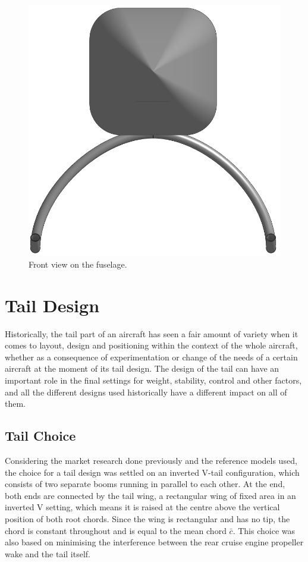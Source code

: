 \documentclass[english,fira]{ist-report}
\begin{document}
\begin{figure}[ht]
	\centering
	\includegraphics[width = 0.5\linewidth]{graphics/fuselageExternal2.png}
	\caption{Front view on the fuselage.}
	\label{fig:fuseExt2}
\end{figure}

\chapter{Tail Design}

Historically, the tail part of an aircraft has seen a fair amount of variety when it comes to layout, design and positioning within the context of the whole aircraft, whether as a consequence of experimentation or change of the needs of a certain aircraft at the moment of its tail design. The design of the tail can have an important role in the final settings for weight, stability, control and other factors, and all the different designs used historically have a different impact on all of them.

\section{Tail Choice}\label{sec:tailchoice}

Considering the market research done previously and the reference models used, the choice for a tail design was settled on an inverted V-tail configuration, which consists of two separate booms running in parallel to each other. At the end, both ends are connected by the tail wing, a rectangular wing of fixed area in an inverted V setting, which means it is raised at the centre above the vertical position of both root chords. Since the wing is rectangular and has no tip, the chord is constant throughout and is equal to the mean chord $\bar{c}$. This choice was also based on minimising the interference between the rear cruise engine propeller wake and the tail itself.
\end{document}
